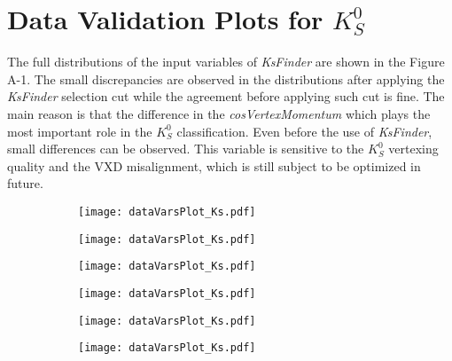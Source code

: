 \chapter{Data Validation Plots for $K_S^0$}
The full distributions of the input variables of \textit{KsFinder} are shown in the Figure A-1. The small discrepancies are observed in the distributions after applying the \textit{KsFinder} selection cut while the agreement before applying such cut is fine. The main reason is that the difference in the \textit{cosVertexMomentum} which plays the most important role in the $K_S^0$ classification. Even before the use of \textit{KsFinder}, small differences can be observed. This variable is sensitive to the $K_S^0$ vertexing quality and the VXD misalignment, which is still subject to be optimized in future. 
  
\begin{figure}[H]
\caption{The distribution of the training variables in KsFinder. The blue and purple solid lines in the top plots are the total and true $K_S^0$ distributions from generic MC, respectively. The bottom plots are the data-MC ratio before (blue) and after (red) applying \textit{KsFinder} cut.}
\begin{subfigure}{0.5\linewidth}
\texttt{[image: dataVarsPlot\_Ks.pdf]}
\end{subfigure}
\begin{subfigure}{0.5\linewidth}
\texttt{[image: dataVarsPlot\_Ks.pdf]}
\end{subfigure}
\end{figure}

\begin{figure}[H]
\ContinuedFloat
\begin{subfigure}{0.5\linewidth}
	\texttt{[image: dataVarsPlot\_Ks.pdf]}
\end{subfigure}
\begin{subfigure}{0.5\linewidth}
	\texttt{[image: dataVarsPlot\_Ks.pdf]}
\end{subfigure}
\begin{subfigure}{0.5\linewidth}
	\texttt{[image: dataVarsPlot\_Ks.pdf]}
\end{subfigure}
\begin{subfigure}{0.5\linewidth}
	\texttt{[image: dataVarsPlot\_Ks.pdf]}
\end{subfigure}
\end{figure}

